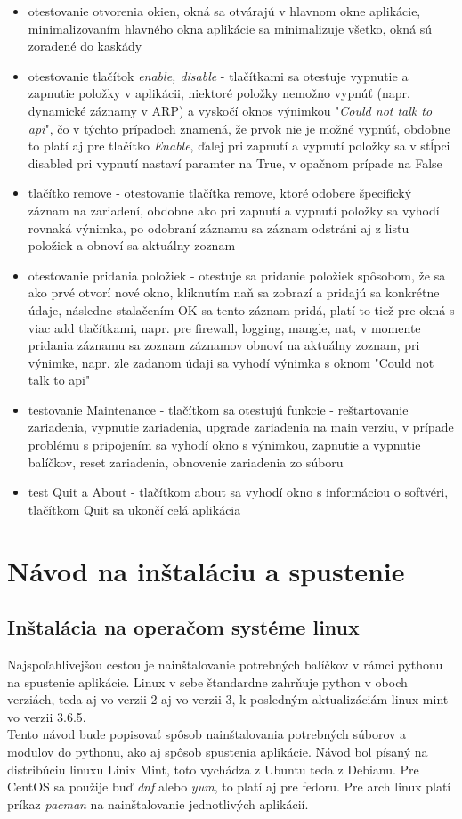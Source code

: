 \begin{itemize}
\item otestovanie otvorenia okien, okná sa otvárajú v hlavnom okne aplikácie, minimalizovaním hlavného okna aplikácie sa minimalizuje všetko, okná sú zoradené do kaskády
\item otestovanie tlačítok \textit{enable, disable} - tlačítkami sa otestuje vypnutie a zapnutie položky v aplikácii, niektoré položky nemožno vypnúť (napr. dynamické záznamy v ARP) a vyskočí oknos výnimkou "\textit{Could not talk to api}", čo v týchto prípadoch znamená, že prvok nie je možné vypnúť, obdobne to platí aj pre tlačítko \textit{Enable}, ďalej pri zapnutí a vypnutí položky sa v stĺpci disabled pri vypnutí nastaví paramter na True, v opačnom prípade na False
\item tlačítko remove - otestovanie tlačítka remove, ktoré odobere špecifický záznam na zariadení, obdobne ako pri zapnutí a vypnutí položky sa vyhodí rovnaká výnimka, po odobraní záznamu sa záznam odstráni aj z listu položiek a obnoví sa aktuálny zoznam 
\item otestovanie pridania položiek - otestuje sa pridanie položiek spôsobom, že sa ako prvé otvorí nové okno, kliknutím naň sa zobrazí  a pridajú sa konkrétne údaje, následne stalačením OK sa tento záznam pridá, platí to tiež pre okná s viac add tlačítkami, napr. pre firewall, logging, mangle, nat, v momente pridania záznamu  sa zoznam záznamov obnoví na aktuálny zoznam, pri výnimke, napr. zle zadanom údaji sa vyhodí výnimka s oknom "Could not talk to api"
\item testovanie Maintenance - tlačítkom sa otestujú funkcie - reštartovanie zariadenia, vypnutie zariadenia, upgrade zariadenia na main verziu, v prípade problému s pripojením sa vyhodí okno s výnimkou, zapnutie a vypnutie balíčkov, reset zariadenia, obnovenie zariadenia zo súboru
\item test Quit a About - tlačítkom about sa vyhodí okno s informáciou o softvéri, tlačítkom Quit sa ukončí celá aplikácia 
\end{itemize}
\chapter{Návod na inštaláciu a spustenie}
\section{Inštalácia na operačom systéme linux}
Najspoľahlivejšou cestou je nainštalovanie potrebných balíčkov v rámci pythonu na spustenie aplikácie. Linux v sebe štandardne zahrňuje python v oboch verziách, teda aj vo verzii 2 aj vo verzii 3, k posledným aktualizáciám linux mint vo verzii 3.6.5. \\
Tento návod bude popisovať spôsob nainštalovania potrebných súborov a modulov do pythonu, ako aj spôsob spustenia aplikácie. Návod bol písaný na distribúciu linuxu Linix Mint, toto vychádza z Ubuntu teda z Debianu. Pre CentOS sa použije buď \textit{dnf} alebo \textit{yum}, to platí aj pre  fedoru. Pre arch linux platí príkaz \textit{pacman} na nainštalovanie jednotlivých aplikácií. 
